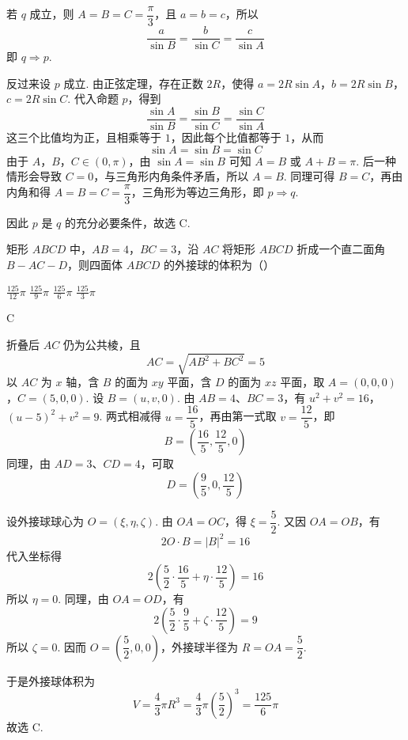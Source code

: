 \begin{solution}
若 \(q\) 成立，则 \(A=B=C=\dfrac\pi3\)，且 \(a=b=c\)，所以
\[
\frac{a}{\sin B}=\frac{b}{\sin C}=\frac{c}{\sin A}
\]
即 \(q\Rightarrow p\).

反过来设 \(p\) 成立. 由正弦定理，存在正数 \(2R\)，使得
\(a=2R\sin A\)，\(b=2R\sin B\)，\(c=2R\sin C\).
代入命题 \(p\)，得到
\[
\frac{\sin A}{\sin B}=\frac{\sin B}{\sin C}=\frac{\sin C}{\sin A}
\]
这三个比值均为正，且相乘等于 \(1\)，因此每个比值都等于 \(1\)，从而
\[
\sin A=\sin B=\sin C
\]
由于 \(A\)，\(B\)，\(C\in(0,\pi)\)，由 \(\sin A=\sin B\) 可知 \(A=B\) 或 \(A+B=\pi\). 后一种情形会导致 \(C=0\)，与三角形内角条件矛盾，所以 \(A=B\). 同理可得 \(B=C\)，再由内角和得 \(A=B=C=\dfrac\pi3\)，三角形为等边三角形，即 \(p\Rightarrow q\).

因此 \(p\) 是 \(q\) 的充分必要条件，故选 C.
\end{solution}

\begin{problem}
矩形 \(ABCD\) 中，\(AB=4\)，\(BC=3\)，沿 \(AC\) 将矩形 \(ABCD\) 折成一个直二面角 \(B-AC-D\)，则四面体 \(ABCD\) 的外接球的体积为（\quad）

\choices
    {\(\frac{125}{12}\pi\)}
    {\(\frac{125}{9}\pi\)}
    {\(\frac{125}{6}\pi\)}
    {\(\frac{125}{3}\pi\)}
\end{problem}

\begin{answer}
C
\end{answer}

\begin{solution}
折叠后 \(AC\) 仍为公共棱，且
\[
AC=\sqrt{AB^2+BC^2}=5
\]
以 \(AC\) 为 \(x\) 轴，含 \(B\) 的面为 \(xy\) 平面，含 \(D\) 的面为 \(xz\) 平面，取
\(A=(0,0,0)\)，\(C=(5,0,0)\).
设 \(B=(u,v,0)\). 由 \(AB=4\)、\(BC=3\)，有
\(u^2+v^2=16\)，\((u-5)^2+v^2=9\).
两式相减得 \(u=\dfrac{16}{5}\)，再由第一式取 \(v=\dfrac{12}{5}\)，即
\[
B=\left(\frac{16}{5},\frac{12}{5},0\right)
\]
同理，由 \(AD=3\)、\(CD=4\)，可取
\[
D=\left(\frac95,0,\frac{12}{5}\right)
\]

设外接球球心为 \(O=(\xi,\eta,\zeta)\). 由 \(OA=OC\)，得 \(\xi=\dfrac52\). 又因 \(OA=OB\)，有
\[
2O\cdot B=|B|^2=16
\]
代入坐标得
\[
2\left(\frac52\cdot\frac{16}{5}+\eta\cdot\frac{12}{5}\right)=16
\]
所以 \(\eta=0\). 同理，由 \(OA=OD\)，有
\[
2\left(\frac52\cdot\frac95+\zeta\cdot\frac{12}{5}\right)=9
\]
所以 \(\zeta=0\). 因而 \(O=\left(\dfrac52,0,0\right)\)，外接球半径为 \(R=OA=\dfrac52\).

于是外接球体积为
\[
V=\frac43\pi R^3=\frac43\pi\left(\frac52\right)^3=\frac{125}{6}\pi
\]
故选 C.
\end{solution}

